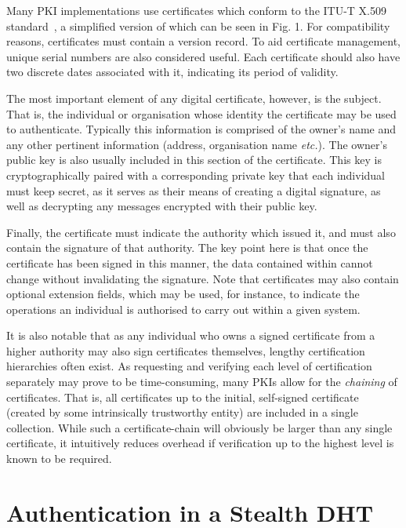 \documentclass[pdftex,conference,10pt]{IEEEtran}
\begin{document}
Many PKI implementations use certificates which conform to the ITU-T
X.509 standard~\cite{X509}, a simplified version of which can be seen
in Fig. 1. For compatibility reasons, certificates must contain a
version record. To aid certificate management, unique serial numbers
are also considered useful. Each certificate should also have two
discrete dates associated with it, indicating its period of validity.

The most important element of any digital certificate, however, is the
subject. That is, the individual or organisation whose identity the
certificate may be used to authenticate. Typically this information is
comprised of the owner's name and any other pertinent information
(address, organisation name \emph{etc.}). The owner's public key is
also usually included in this section of the certificate. This key is
cryptographically paired with a corresponding private key that each
individual must keep secret, as it serves as their means of creating a
digital signature, as well as decrypting any messages encrypted with
their public key.

Finally, the certificate must indicate the authority which issued it,
and must also contain the signature of that authority. The key point
here is that once the certificate has been signed in this manner, the
data contained within cannot change without invalidating the signature.
Note that certificates may also contain optional extension fields,
which may be used, for instance, to indicate the operations an
individual is authorised to carry out within a given system.

It is also notable that as any individual who owns a signed certificate
from a higher authority may also sign certificates themselves, lengthy
certification hierarchies often exist. As requesting and verifying each
level of certification separately may prove to be time-consuming, many
PKIs allow for the \emph{chaining} of certificates. That is, all
certificates up to the initial, self-signed certificate (created by
some intrinsically trustworthy entity) are included in a single
collection. While such a certificate-chain will obviously be larger
than any single certificate, it intuitively reduces overhead if
verification up to the highest level is known to be required.

\section{Authentication in a Stealth DHT}
\label{sect-auth}
\end{document}
